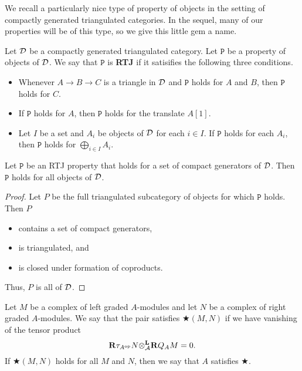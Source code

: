 We recall a particularly nice type of property of objects in the setting of compactly generated triangulated categories.
In the sequel, many of our properties will be of this type, so we give this little gem a name.

\begin{definition} \label{definition: run the jewels}
  Let \(\mathcal{D}\) be a compactly generated triangulated category.
  Let \(\mathtt{P}\) be a property of objects of \(\mathcal{D}\). 
  We say that \(\mathtt{P}\) is \textbf{RTJ} if it satisifies the following three conditions.
  \begin{itemize}
  \item Whenever \(A \to B \to C\) is a triangle in \(\mathcal{D}\) and \(\mathtt{P}\) holds for \(A\) and \(B\), then \(\mathtt{P}\) holds for \(C\). 
  \item If \(\mathtt{P}\) holds for \(A\), then \(\mathtt{P}\) holds for the translate \(A[1]\).
  \item Let \(I\) be a set and \(A_i\) be objects of \(\mathcal{D}\) for each \(i \in I\). If \(\mathtt{P}\) holds for each \(A_i\), then \(\mathtt{P}\) holds for \(\bigoplus_{i \in I} A_i\). 
  \end{itemize}
\end{definition}

\begin{proposition} \label{proposition: RTJ properties}
  Let \(\mathtt{P}\) be an RTJ property that holds for a set of compact generators of \(\mathcal{D}\). Then \(\mathtt{P}\) holds for all objects of \(\mathcal{D}\).
\end{proposition}

\begin{proof}
  Let \(P\) be the full triangulated subcategory of objects for which \(\mathtt{P}\) holds. Then \(P\)
  \begin{itemize}
  \item contains a set of compact generators,
  \item is triangulated, and
  \item is closed under formation of coproducts. 
  \end{itemize}
  Thus, \(P\) is all of \(\mathcal{D}\). 
\end{proof}


\begin{definition} \label{definition: tensor vanishing}
  Let \(M\) be a complex of left graded \(A\)-modules and let \(N\) be a complex of right graded \(A\)-modules. We say that the pair satisfies \(\bigstar(M,N)\) if we have vanishing of the tensor product
  \begin{displaymath}
    \mathbf{R} \tau_{A^{\operatorname{op}}} N {\otimes}^{\mathbf{L}}_{\mathcal A} \mathbf{R} Q_A M = 0.
  \end{displaymath}
  If \(\bigstar(M,N)\) holds for all \(M\) and \(N\), then we say that \(A\) satisfies \(\bigstar\). 
\end{definition}

